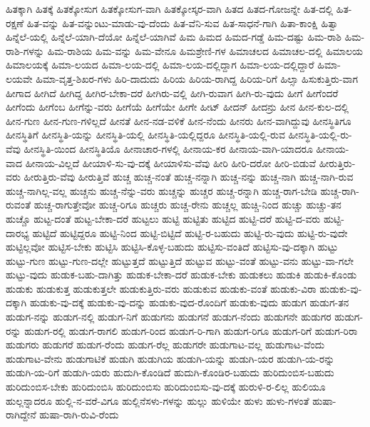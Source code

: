 {ಹಿತಕ್ಕಾಗಿ
ಹಿತಕ್ಕೆ
ಹಿತಕ್ಕೋಸುಗ
ಹಿತಕ್ಕೋಸುಗ-ವಾಗಿ
ಹಿತಕ್ಕೋಸ್ಕರ-ವಾಗಿ
ಹಿತದ
ಹಿತದ-ಗೋಜನ್ನೇ
ಹಿತ-ದಲ್ಲಿ
ಹಿತ-ರಕ್ಷಣೆ
ಹಿತ-ವನ್ನು
ಹಿತ-ವನ್ನುಂಟು-ಮಾಡು-ವು-ದೆಂದು
ಹಿತ-ವೆನಿ-ಸುವ
ಹಿತ-ಸಾಧನೆ-ಗಾಗಿ
ಹಿತಾ-ಕಾಂಕ್ಷಿ
ಹಿತ್ವಾ
ಹಿನ್ನೆಲೆ-ಯಲ್ಲಿ
ಹಿನ್ನೆಲೆ-ಯಾಗಿ-ದೆಯೋ
ಹಿನ್ನೆಲೆ-ಯಾಗಿವೆ
ಹಿಮ
ಹಿಮದ
ಹಿಮದ-ಗಡ್ಡೆ
ಹಿಮ-ದಷ್ಟು
ಹಿಮ-ರಾಶಿ
ಹಿಮ-ರಾಶಿ-ಗಳನ್ನು
ಹಿಮ-ರಾಶಿಯ
ಹಿಮ-ವನ್ನು
ಹಿಮ-ವೇನೂ
ಹಿಮಶ್ರೇಣಿ-ಗಳ
ಹಿಮಾಚಲದ
ಹಿಮಾಚಲ-ದಲ್ಲಿ
ಹಿಮಾಲಯ
ಹಿಮಾಲಯಕ್ಕೆ
ಹಿಮಾ-ಲಯದ
ಹಿಮಾ-ಲಯ-ದಲ್ಲಿ
ಹಿಮಾ-ಲಯ-ದಲ್ಲಿದ್ದಾಗ
ಹಿಮಾ-ಲಯ-ದಲ್ಲಿದ್ದಾರೆ
ಹಿಮಾ-ಲಯವೇ
ಹಿಮಾ-ವೃತ್ತ-ಶಿಖರ-ಗಳು
ಹಿರಿ-ದಾದುದು
ಹಿರಿಯ
ಹಿರಿಯ-ರಾಗಿದ್ದ
ಹಿರಿಯ-ರಿಗೆ
ಹಿಲ್ಸಾ
ಹಿಸುಕುತ್ತಿರು-ವಾಗ
ಹೀಗಾದ
ಹೀಗಿದೆ
ಹೀಗಿದ್ದ
ಹೀಗಿರ-ಬೇಕಾ-ದರೆ
ಹೀಗಿರು-ವಲ್ಲಿ
ಹೀಗಿ-ರುವಾಗ
ಹೀಗಿ-ರು-ವುದು
ಹೀಗೆ
ಹೀಗೆಂದರೆ
ಹೀಗೆಂದು
ಹೀಗೆಂಬ
ಹೀಗೆನ್ನು-ವರು
ಹೀಗೆಯೆ
ಹೀಗೆಯೇ
ಹೀಗೇ
ಹೀಟ್
ಹೀದನ್
ಹೀದನ್ರು
ಹೀನ
ಹೀನ-ಕುಲ-ದಲ್ಲಿ
ಹೀನ-ಗುಣ
ಹೀನ-ಗುಣ-ಗಳಿಲ್ಲದೆ
ಹೀನತೆ
ಹೀನ-ನಡ-ವಳಿಕೆ
ಹೀನ-ನೆಂದು
ಹೀನರು
ಹೀನ-ವಾಗಿದ್ದುವು
ಹೀನಸ್ಥಿತಿಗೂ
ಹೀನಸ್ಥಿತಿಗೆ
ಹೀನಸ್ಥಿತಿ-ಯನ್ನು
ಹೀನಸ್ಥಿತಿ-ಯಲ್ಲಿ
ಹೀನಸ್ಥಿತಿ-ಯಲ್ಲಿದ್ದರೂ
ಹೀನಸ್ಥಿತಿ-ಯಲ್ಲಿ-ರುವ
ಹೀನಸ್ಥಿತಿ-ಯಲ್ಲಿ-ರು-ವೆವು
ಹೀನಸ್ಥಿತಿ-ಯಿಂದ
ಹೀನಸ್ಥಿತಿಯೊ
ಹೀನಾಚಾರ-ಗಳಲ್ಲಿ
ಹೀನಾಯ-ಕರ
ಹೀನಾಯ-ವಾಗಿ-ಯಾದರೂ
ಹೀನಾಯ-ವಾದ
ಹೀನಾಯ-ವಿಲ್ಲದೆ
ಹೀಯಾಳಿ-ಸು-ವು-ದಕ್ಕೆ
ಹೀಯಾಳಿಸು-ವೆವು
ಹೀರಿ
ಹೀರಿ-ದರೋ
ಹೀರಿ-ಬಿಡುವೆ
ಹೀರುತ್ತಿರು-ವರು
ಹೀರುತ್ತಿರು-ವೆವು
ಹೀರುತ್ತಿವೆ
ಹುಚ್ಚ
ಹುಚ್ಚ-ನಂತೆ
ಹುಚ್ಚ-ನನ್ನಾಗಿ
ಹುಚ್ಚ-ನನ್ನು
ಹುಚ್ಚ-ನಾಗಿ
ಹುಚ್ಚ-ನಾಗಿ-ರುವ
ಹುಚ್ಚ-ನಾಗಿಲ್ಲ-ವಲ್ಲ
ಹುಚ್ಚನು
ಹುಚ್ಚ-ನೆನ್ನು-ವರು
ಹುಚ್ಚನ್ನು
ಹುಚ್ಚರ
ಹುಚ್ಚ-ರನ್ನಾಗಿ
ಹುಚ್ಚ-ರಾಗ-ಬೇಡಿ
ಹುಚ್ಚ-ರಾಗಿ-ರುವಂತೆ
ಹುಚ್ಚ-ರಾಗುತ್ತೇವೋ
ಹುಚ್ಚ-ರಿಗೂ
ಹುಚ್ಚರು
ಹುಚ್ಚ-ರೇನು
ಹುಚ್ಚಲ್ಲ
ಹುಚ್ಚಿ-ನಿಂದ
ಹುಚ್ಚು
ಹುಚ್ಚು-ತನ
ಹುಚ್ಚೊ
ಹುಟ್ಟ-ದಂತೆ
ಹುಟ್ಟ-ಬೇಕಾ-ದರೆ
ಹುಟ್ಟಲು
ಹುಟ್ಟಿ
ಹುಟ್ಟಿತು
ಹುಟ್ಟಿದ
ಹುಟ್ಟಿ-ದರೆ
ಹುಟ್ಟಿ-ದ-ವರು
ಹುಟ್ಟಿ-ದಾರಭ್ಯ
ಹುಟ್ಟಿದೆ
ಹುಟ್ಟಿದ್ದರೂ
ಹುಟ್ಟಿ-ನಿಂದ
ಹುಟ್ಟಿ-ಬಿಟ್ಟಿದೆ
ಹುಟ್ಟಿ-ರ-ಬಹುದು
ಹುಟ್ಟಿ-ರು-ವುದು
ಹುಟ್ಟಿ-ರು-ವುದೇ
ಹುಟ್ಟಿಲ್ಲವೋ
ಹುಟ್ಟಿಸ-ಬೇಕು
ಹುಟ್ಟಿಸಿ
ಹುಟ್ಟಿಸಿ-ಕೊಳ್ಳ-ಬಹುದು
ಹುಟ್ಟಿಸು-ವಂತಿದೆ
ಹುಟ್ಟಿಸು-ವು-ದಕ್ಕಾಗಿ
ಹುಟ್ಟು
ಹುಟ್ಟು-ಗುಣ
ಹುಟ್ಟು-ಗುಣ-ದಲ್ಲೇ
ಹುಟ್ಟುತ್ತದೆ
ಹುಟ್ಟುತ್ತಿದೆ
ಹುಟ್ಟುವ
ಹುಟ್ಟು-ವಂತೆ
ಹುಟ್ಟು-ವನು
ಹುಟ್ಟು-ವಾ-ಗಲೇ
ಹುಟ್ಟು-ವುದು
ಹುಡುಕ-ಬಹು-ದಾಗಿತ್ತು
ಹುಡುಕ-ಬೇಕಾ-ದರೆ
ಹುಡುಕ-ಬೇಕು
ಹುಡುಕಲು
ಹುಡುಕಿ
ಹುಡುಕಿ-ಕೊಂಡು
ಹುಡುಕು
ಹುಡುಕುತ್ತ
ಹುಡುಕುತ್ತಲೇ
ಹುಡುಕುತ್ತಿರು-ವರು
ಹುಡುಕುವ
ಹುಡುಕು-ವಂತೆ
ಹುಡುಕು-ವಿರಾ
ಹುಡುಕು-ವು-ದಕ್ಕಾಗಿ
ಹುಡುಕು-ವು-ದಕ್ಕೆ
ಹುಡುಕು-ವು-ದನ್ನು
ಹುಡುಕು-ವುದ-ರೊಂದಿಗೆ
ಹುಡುಕು-ವುದು
ಹುಡುಗ
ಹುಡುಗ-ತನ
ಹುಡುಗ-ನನ್ನು
ಹುಡುಗ-ನಲ್ಲಿ
ಹುಡುಗ-ನಿಗೆ
ಹುಡುಗನು
ಹುಡುಗನೆ
ಹುಡುಗ-ನೆಂದು
ಹುಡುಗನೇ
ಹುಡುಗರ
ಹುಡುಗ-ರನ್ನು
ಹುಡುಗ-ರಲ್ಲಿ
ಹುಡುಗ-ರಾಗಲಿ
ಹುಡುಗ-ರಿಂದ
ಹುಡುಗ-ರಿ-ಗಾಗಿ
ಹುಡುಗ-ರಿಗೂ
ಹುಡುಗ-ರಿಗೆ
ಹುಡುಗ-ರಿರಾ
ಹುಡುಗರು
ಹುಡುಗರೆ
ಹುಡುಗ-ರೆಂದು
ಹುಡುಗ-ರೆಲ್ಲ
ಹುಡುಗರೇ
ಹುಡುಗಾಟ-ವಲ್ಲ
ಹುಡುಗಾಟ-ವೆಂದು
ಹುಡುಗಾಟ-ವೇನು
ಹುಡುಗಾಟಿಕೆ
ಹುಡುಗಿ
ಹುಡುಗಿಯ
ಹುಡುಗಿ-ಯನ್ನು
ಹುಡುಗಿ-ಯರ
ಹುಡುಗಿ-ಯ-ರನ್ನು
ಹುಡುಗಿ-ಯ-ರಿಗೆ
ಹುಡುಗಿ-ಯರು
ಹುದುಗಿ-ಕೊಂಡಿದೆ
ಹುದುಗಿ-ಕೊಂಡಿರ-ಬಹುದು
ಹುರಿದುಂಬಿಸ-ಬಹುದು
ಹುರಿದುಂಬಿಸ-ಬೇಕು
ಹುರಿದುಂಬಿಸಿ
ಹುರಿದುಂಬಿಸು
ಹುರಿದುಂಬಿಸು-ವು-ದಕ್ಕೆ
ಹುರುಳಿ-ರ-ಲಿಲ್ಲ
ಹುಲಿಯೂ
ಹುಲ್ಲನ್ನಾದರೂ
ಹುಲ್ಲಿ-ನ-ವರೆ-ವಿಗೂ
ಹುಲ್ಲಿನೆಸಳು-ಗಳನ್ನು
ಹುಲ್ಲು
ಹುಳಿಯೇ
ಹುಳು
ಹುಳು-ಗಳಂತೆ
ಹುಷಾ-ರಾಗಿದ್ದೇನೆ
ಹುಷಾ-ರಾಗಿ-ರುವಿ-ರೆಂದು
}
